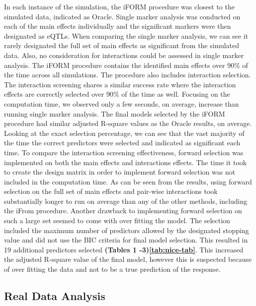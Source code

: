 \documentclass[11pt,]{book}
\theoremstyle{definition}
\theoremstyle{definition}
\theoremstyle{remark}
\begin{document}
In each instance of the simulation, the iFORM procedure was closest to
the simulated data, indicated as Oracle. Single marker analysis was
conducted on each of the main effects individually and the significant
markers were then designated as eQTLs. When comparing the single marker
analysis, we can see it rarely designated the full set of main effects
as significant from the simulated data. Also, no consideration for
interactions could be assessed in single marker analysis. The iFORM
procedure contains the identified main effects over 90\% of the time
across all simulations. The procedure also includes interaction
selection. The interaction screening shares a similar success rate where
the interaction effects are correctly selected over 90\% of the time as
well. Focusing on the computation time, we observed only a few seconds,
on average, increase than running single marker analysis. The final
models selected by the iFORM procedure had similar adjusted R-square
values as the Oracle results, on average. Looking at the exact selection
percentage, we can see that the vast majority of the time the correct
predictors were selected and indicated as significant each time. To
compare the interaction screening effectiveness, forward selection was
implemented on both the main effects and interactions effects. The time
it took to create the design matrix in order to implement forward
selection was not included in the computation time. As can be seen from
the results, using forward selection on the full set of main effects and
pair-wise interactions took substantially longer to run on average than
any of the other methods, including the iFrom procedure. Another
drawback to implementing forward selection on such a large set seemed to
come with over fitting the model. The selection included the maximum
number of predictors allowed by the designated stopping value and did
not use the BIC criteria for final model selection. This resulted in 19
additional predictors selected \textbf{(Tables 1 -3)\ref{tab:nice-tab}}.
This increased the adjusted R-square value of the final model, however
this is suspected because of over fitting the data and not to be a true
prediction of the response.

\subsection{Real Data Analysis}\label{real-data-analysis}
\end{document}
